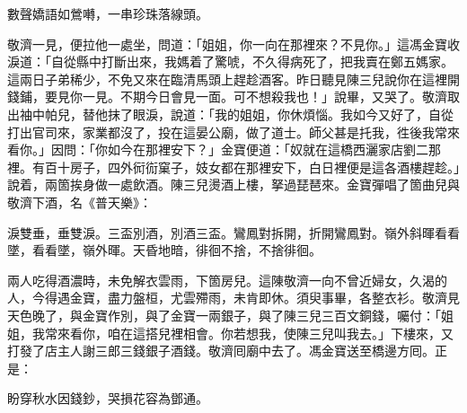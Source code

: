 \begin{myquote}
數聲嬌語如鶯囀，一串珍珠落線頭。
\end{myquote}

敬濟一見，便拉他一處坐，問道：「姐姐，你一向在那裡來？不見你。」這馮金寶收淚道：「自從縣中打斷出來，我媽着了驚唬，不久得病死了，把我賣在鄭五媽家。這兩日子弟稀少，不免又來在臨清馬頭上趕趁酒客。昨日聽見陳三兒說你在這裡開錢鋪，要見你一見。不期今日會見一面。可不想殺我也！」說畢，又哭了。敬濟取出袖中帕兒，替他抹了眼淚，說道：「我的姐姐，你休煩惱。我如今又好了，{}自從打出官司來，家業都沒了，投在這晏公廟，做了道士。師父甚是托我，徃後我常來看你。」因問：「你如今在那裡安下？」金寶便道：「奴就在這橋西灑家店劉二那裡。有百十房子，四外衏䘕窠子，妓女都在那裡安下，白日裡便是這各酒樓趕趁。」說着，兩箇挨身做一處飲酒。陳三兒燙酒上樓，拏過琵琶來。金寶彈唱了箇曲兒與敬濟下酒，名《普天樂》：

\begin{myquote}
淚雙垂，垂雙淚。三盃別酒，別酒三盃。鸞鳳對拆開，折開鸞鳳對。嶺外斜暉看看墜，看看墜，嶺外暉。天昏地暗，徘徊不捨，不捨徘徊。
\end{myquote}

兩人吃得酒濃時，未免解衣雲雨，下箇房兒。這陳敬濟一向不曾近婦女，久渴的人，今得遇金寶，盡力盤桓，尤雲殢雨，未肯即休。須臾事畢，各整衣衫。敬濟見天色晚了，與金寶作別，與了金寶一兩銀子，與了陳三兒三百文銅錢，囑付：「姐姐，我常來看你，咱在這搭兒裡相會。你若想我，使陳三兒叫我去。」{}下樓來，又打發了店主人謝三郎三錢銀子酒錢。敬濟囘廟中去了。馮金寶送至橋邊方囘。正是：

\begin{myquote}
盼穿秋水因錢鈔，哭損花容為鄧通。
\end{myquote}

